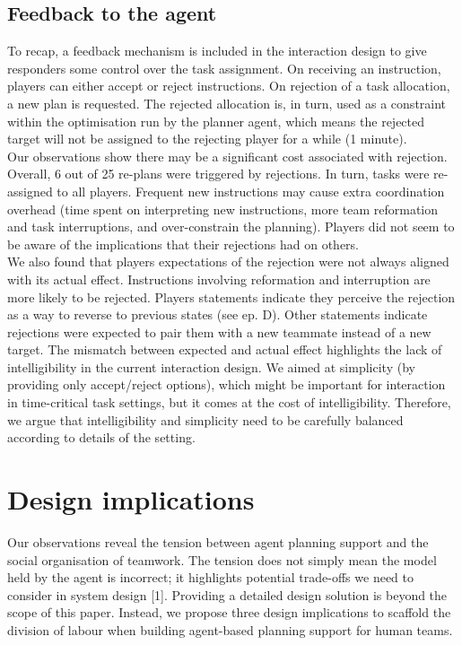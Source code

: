\subsection{Feedback to the agent}\label{sec:studytwofeedback}

To recap, a feedback mechanism is included in the interaction design to give responders some control over the task assignment. On receiving an instruction, players can either accept or reject instructions. On rejection of a task allocation, a new plan is requested. The rejected allocation is, in turn, used as a constraint within the optimisation run by the planner agent, which means the rejected target will not be assigned to the rejecting player for a while (1 minute). \\

Our observations show there may be a significant cost associated with rejection. Overall, 6 out of 25 re-plans were triggered by rejections. In turn, tasks were re-assigned to all players. Frequent new instructions may cause extra coordination overhead (time spent on interpreting new instructions, more team reformation and task interruptions, and over-constrain the planning). Players did not seem to be aware of the implications that their rejections had on others.\\
 
We also found that players expectations of the rejection were not always aligned with its actual effect. Instructions involving reformation and interruption are more likely to be rejected. Players statements indicate they perceive the rejection as a way to reverse to previous states (see ep. D). Other statements indicate rejections were expected to pair them with a new teammate instead of a new target. The mismatch between expected and actual effect highlights the lack of intelligibility in the current interaction design. We aimed at simplicity (by providing only accept/reject options), which might be important for interaction in time-critical task settings, but it comes at the cost of intelligibility. Therefore, we argue that intelligibility and simplicity need to be carefully balanced according to details of the setting.\\


\section{Design implications}

Our observations reveal the tension between agent planning support and the social organisation of teamwork. The tension does not simply mean the model held by the agent is incorrect; it highlights potential trade-offs we need to consider in system design [1]. Providing a detailed design solution is beyond the scope of this paper. Instead, we propose three design implications to scaffold the division of labour when building agent-based planning support for human teams.\\

